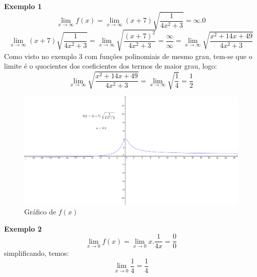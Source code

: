 \textbf{Exemplo 1}
$$
\lim_{x \to \infty} f(x) = \lim_{x \to \infty} (x+7)\sqrt{\frac{1}{4x^2+3}} = \infty . 0
$$ 
$$
\lim_{x \to \infty} (x+7)\sqrt{\frac{1}{4x^2+3}} = \lim_{x \to \infty} \sqrt{\frac{(x+7)^2}{4x^2+3}} = \frac{\infty}{\infty} = \lim_{x \to \infty} \sqrt{\frac{x^2+14x+49}{4x^2+3}}
$$
Como visto no exemplo 3 com funções polinomiais de mesmo grau, tem-se que o limite é o quocientes dos coeficientes dos termos de maior grau, logo:
$$
\lim_{x \to \infty} \sqrt{\frac{x^2+14x+49}{4x^2+3}} = \lim_{x \to \infty} \sqrt{\frac{1}{4}} = \frac{1}{2}
$$

\begin{figure}[H]
\centering %
\includegraphics[width=15cm]{img/graph15.png} %
\caption{Gráfico de $f(x)$}
\label{fig:graph15}
\end{figure}

\textbf{Exemplo 2}
$$
\lim_{x \to 0} f(x) = \lim_{x \to 0} x . \frac{1}{4x} = \frac{0}{0}
$$
simplificando, temos:
$$
\lim_{x \to 0} \frac{1}{4} = \frac{1}{4}
$$

